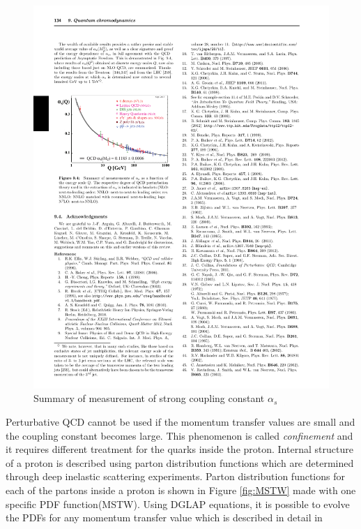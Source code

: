 \begin{figure}[htbp]
	\centering
		\includegraphics{Figures/alpha_s.pdf}
	\caption[Strong force coupling constant]{Summary of measurement of strong coupling constant $\alpha_s$ \cite{Agashe:2014kda} }
	\label{fig:alpha_s}
\end{figure}

	\par Perturbative QCD cannot be used if the momentum transfer values are small and the coupling constant becomes large. This phenomenon is called \textit{confinement} and it requires different treatment for the quarks inside the proton. Internal structure of a proton is described using parton distribution functions which  are determined through deep inelastic scattering experiments. Parton distribution functions for each of the partons inside a proton is shown in Figure \ref{fig:MSTW} made with one specific PDF function(MSTW). Using DGLAP equations, it is possible to evolve the PDFs for any momentum transfer value which is described in detail in \cite{Campbell:2006wx} 

